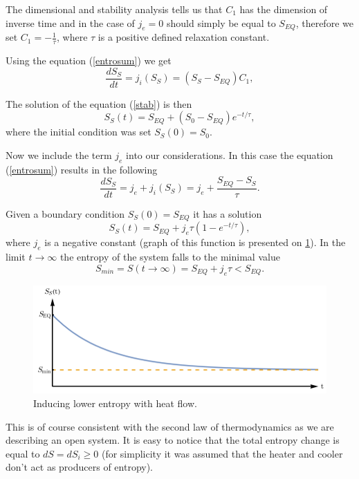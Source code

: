 \documentclass[a4paper,12pt]{article}
\begin{document}
The dimensional and stability analysis tells us that $C_1$ has the dimension of inverse time and in the case of 
$j_e=0$ should simply be equal to $S_{EQ}$, therefore we set $C_1 = -\frac{1}{\tau}$, where $\tau$ is a positive defined relaxation constant.

Using the equation (\ref{entrosum}) we get
\begin{equation}
\frac{dS_S}{dt}=j_i\left(S_S\right)=\left(S_S-S_{EQ}\right)C_1, 
\label{stab}
\end{equation} 

The solution of the equation (\ref{stab}) is then
\begin{equation}
S_S(t) =S_{EQ}+(S_0-S_{EQ})e^{-t/\tau}, 
\end{equation}
where the initial condition was set $S_S(0)=S_0$.


Now we include the term $j_e$ into our considerations.
In this case the equation (\ref{entrosum}) results in the following 
\begin{equation}
\frac{dS_S}{dt}=j_e + j_i\left(S_S\right)=j_e +\frac{S_{EQ}-S_S}{\tau}.
\label{dSSdt}
\end{equation} 

 
Given a boundary condition $S_S(0) =S_{EQ}$ it has a solution
\begin{equation}
S_S(t)=S_{EQ}+j_e\tau \left(1-e^{-t/\tau }\right),
\end{equation} 
where $j_e$ is a negative constant (graph of this function is presented on \ref{Fig4}). 
In the limit $t\rightarrow \infty$ the entropy of the system falls to the minimal value
\begin{equation}
S_{min}=S(t\rightarrow \infty) =S_{EQ}+j_e \tau < S_{EQ}.
\end{equation}

\begin{figure}[ht!]
\centering \includegraphics[width=12cm]{wykres3} 
\caption{Inducing lower entropy with heat flow.}
\label{Fig4} 
\end{figure}

This is of course consistent with the second law of thermodynamics as we are describing an open system.
It is easy to notice that the total entropy change is equal to $dS=dS_i \geq 0$ (for simplicity it was assumed that the heater and cooler don't act as producers of entropy).
\end{document}
